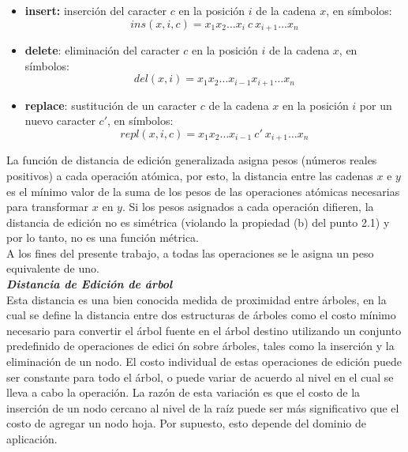 \begin{itemize}
\item \textbf{insert:} inserci\'on del caracter $c$ en la posici\'on $i$
de la cadena $x$, en s\'imbolos: 
\[ins(x,i,c)=x_1 x_2 \ldots x_i\ c\ x_{i+1} \ldots x_n\]
 
\item  \textbf{delete}: eliminaci\'on del caracter $c$ en la posici\'on 
$i$ de la cadena $x$, en s\'imbolos:
  \[ del(x,i)=x_1 x_2 \ldots x_{i-1} x_{i+1} \ldots x_n\]
  
  
\item \textbf{replace}: sustituci\'on de un caracter $c$ de la cadena $x$ en 
la posici\'on $i$ por un nuevo caracter $c'$, en s\'imbolos:
\[repl(x,i,c)=x_1 x_2 \ldots x_{i-1}\ c' \ x_{i+1} \ldots x_n\]
\end{itemize}


La funci\'on de distancia de edici\'on generalizada asigna pesos (n\'umeros reales positivos) a 
cada operaci\'on at\'omica, por esto, la distancia entre las cadenas $x$ e $y$ es el m\'inimo 
valor de la suma de los pesos de las operaciones at\'omicas necesarias para transformar $x$ en $y
$. Si los pesos asignados a cada operaci\'on difieren, la distancia de edici\'on no es sim\'etrica 
(violando la propiedad (b) del punto 2.1) y por lo tanto, no es una funci\'on m\'etrica.\\

A los fines del presente trabajo, a todas las operaciones se le asigna un peso equivalente de uno.\\

\noindent \textbf{\textit{Distancia de Edici\'on de \'arbol}}\\

Esta distancia es una bien conocida medida de proximidad entre \'arboles, en la cual se define la 
distancia entre dos estructuras de \'arboles como el costo m\'inimo necesario para convertir el 
\'arbol fuente en el \'arbol destino utilizando un conjunto predefinido de operaciones de edici
\'on sobre \'arboles, tales como la inserci\'on y la eliminaci\'on de un nodo. El costo individual 
de estas operaciones de edici\'on puede ser constante para todo el \'arbol, o puede variar de 
acuerdo al nivel en el cual se lleva a cabo la operaci\'on. La raz\'on de esta variaci\'on es que 
el costo de la inserci\'on de un nodo cercano al nivel de la ra\'iz puede ser m\'as significativo 
que el costo de agregar un nodo hoja. Por supuesto, esto depende del dominio de aplicaci\'on.\\

